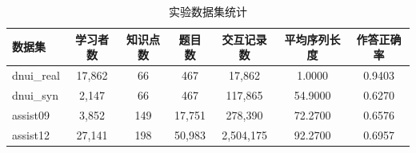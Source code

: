 \begin{table}[htbp]
\centering
\caption{实验数据集统计}
\label{tab:datasets}
\begin{tabular}{lcccccc}
\toprule
数据集 & 学习者数 & 知识点数 & 题目数 & 交互记录数 & 平均序列长度 & 作答正确率 \\
\midrule
dnui_real & 17,862 & 66 & 467 & 17,862 & 1.0000 & 0.9403 \\
dnui_syn & 2,147 & 66 & 467 & 117,865 & 54.9000 & 0.6270 \\
assist09 & 3,852 & 149 & 17,751 & 278,390 & 72.2700 & 0.6576 \\
assist12 & 27,141 & 198 & 50,983 & 2,504,175 & 92.2700 & 0.6957 \\
\bottomrule
\end{tabular}
\end{table}
